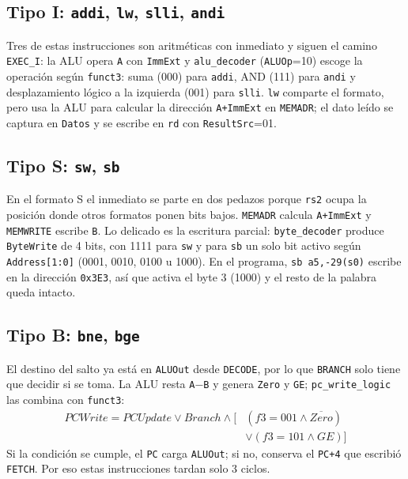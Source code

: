 \documentclass[conference]{IEEEtran}
\newcommand{\cod}[1]{\texttt{\small #1}}
\begin{document}
\subsection{Tipo I: \cod{addi}, \cod{lw}, \cod{slli}, \cod{andi}}
Tres de estas instrucciones son aritméticas con inmediato y siguen el camino \cod{EXEC\_I}: la ALU opera \cod{A} con \cod{ImmExt} y \cod{alu\_decoder} (\cod{ALUOp}=10) escoge la operación según \cod{funct3}: suma (000) para \cod{addi}, AND (111) para \cod{andi} y desplazamiento lógico a la izquierda (001) para \cod{slli}. \cod{lw} comparte el formato, pero usa la ALU para calcular la dirección \cod{A+ImmExt} en \cod{MEMADR}; el dato leído se captura en \cod{Datos} y se escribe en \cod{rd} con \cod{ResultSrc}=01.

\subsection{Tipo S: \cod{sw}, \cod{sb}}
En el formato S el inmediato se parte en dos pedazos porque \cod{rs2} ocupa la posición donde otros formatos ponen bits bajos. \cod{MEMADR} calcula \cod{A+ImmExt} y \cod{MEMWRITE} escribe \cod{B}. Lo delicado es la escritura parcial: \cod{byte\_decoder} produce \cod{ByteWrite} de 4 bits, con 1111 para \cod{sw} y para \cod{sb} un solo bit activo según \cod{Address[1:0]} (0001, 0010, 0100 u 1000). En el programa, \cod{sb a5,-29(s0)} escribe en la dirección \cod{0x3E3}, así que activa el byte 3 (1000) y el resto de la palabra queda intacto.

\subsection{Tipo B: \cod{bne}, \cod{bge}}
El destino del salto ya está en \cod{ALUOut} desde \cod{DECODE}, por lo que \cod{BRANCH} solo tiene que decidir si se toma. La ALU resta \cod{A}$-$\cod{B} y genera \cod{Zero} y \cod{GE}; \cod{pc\_write\_logic} las combina con \cod{funct3}:
\begin{equation}
\begin{split}\mathit{PCWrite}=\mathit{PCUpdate}\lor \mathit{Branch}\land\big[&(f3{=}001\land\overline{Zero})\\&\lor(f3{=}101\land GE)\big]\end{split}
\end{equation}
Si la condición se cumple, el \cod{PC} carga \cod{ALUOut}; si no, conserva el \cod{PC+4} que escribió \cod{FETCH}. Por eso estas instrucciones tardan solo 3 ciclos.
\end{document}
